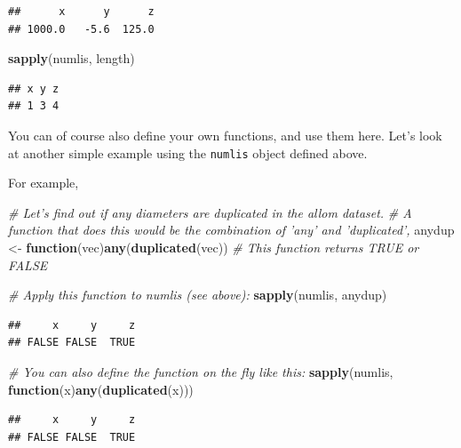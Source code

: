 \documentclass[]{book}
\newenvironment{Shaded}{\begin{snugshade}}{\end{snugshade}}
\newcommand{\CommentTok}[1]{\textcolor[rgb]{0.56,0.35,0.01}{\textit{#1}}}
\newcommand{\ControlFlowTok}[1]{\textcolor[rgb]{0.13,0.29,0.53}{\textbf{#1}}}
\newcommand{\KeywordTok}[1]{\textcolor[rgb]{0.13,0.29,0.53}{\textbf{#1}}}
\newcommand{\NormalTok}[1]{#1}
\newcommand{\StringTok}[1]{\textcolor[rgb]{0.31,0.60,0.02}{#1}}
\begin{document}
\begin{verbatim}
##      x      y      z 
## 1000.0   -5.6  125.0
\end{verbatim}

\begin{Shaded}
\begin{Highlighting}[]
\KeywordTok{sapply}\NormalTok{(numlis, length)}
\end{Highlighting}
\end{Shaded}

\begin{verbatim}
## x y z 
## 1 3 4
\end{verbatim}

You can of course also define your own functions, and use them here. Let's look at another simple example using the \texttt{numlis} object defined above.

For example,

\begin{Shaded}
\begin{Highlighting}[]
\CommentTok{# Let's find out if any diameters are duplicated in the allom dataset.}
\CommentTok{# A function that does this would be the combination of 'any' and 'duplicated',}
\NormalTok{anydup <-}\StringTok{ }\ControlFlowTok{function}\NormalTok{(vec)}\KeywordTok{any}\NormalTok{(}\KeywordTok{duplicated}\NormalTok{(vec))}
\CommentTok{# This function returns TRUE or FALSE}

\CommentTok{# Apply this function to numlis (see above):}
\KeywordTok{sapply}\NormalTok{(numlis, anydup)}
\end{Highlighting}
\end{Shaded}

\begin{verbatim}
##     x     y     z 
## FALSE FALSE  TRUE
\end{verbatim}

\begin{Shaded}
\begin{Highlighting}[]
\CommentTok{# You can also define the function on the fly like this:}
\KeywordTok{sapply}\NormalTok{(numlis, }\ControlFlowTok{function}\NormalTok{(x)}\KeywordTok{any}\NormalTok{(}\KeywordTok{duplicated}\NormalTok{(x)))}
\end{Highlighting}
\end{Shaded}

\begin{verbatim}
##     x     y     z 
## FALSE FALSE  TRUE
\end{verbatim}
\end{document}
